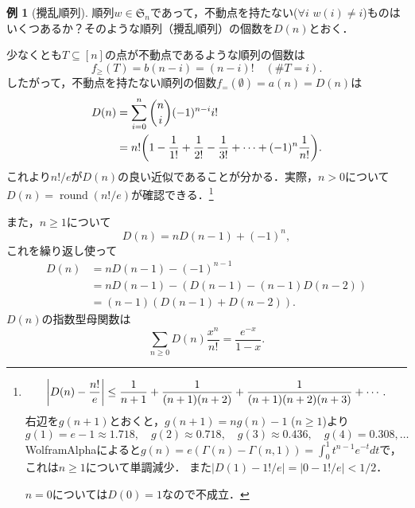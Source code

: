\documentclass[xelatex,ja=standard,a4paper,14pt,everyparhook=compat]{bxjsarticle}
\newcommand{\fS}{\mathfrak{S}}
\newcommand{\paren}[1]{\mleft(#1\mright)}
\newcommand{\norm}[1]{\mleft|#1\mright|}
\theoremstyle{definition}
\newtheorem{example}[theorem]{例}
\begin{document}
\begin{example}[攪乱順列]

    順列$w \in \fS_n$であって，不動点を持たない($\forall i$ $w(i) \neq i$)ものはいくつあるか？そのような順列（攪乱順列）の個数を$D(n)$とおく．

    少なくとも$T \subseteq [n]$の点が不動点であるような順列の個数は \begin{equation*}
        f_\geq(T) = b(n-i) = (n-i)! \quad (\#T = i).
    \end{equation*}
    したがって，不動点を持たない順列の個数$f_=(\emptyset) = a(n) = D(n)$は \begin{align*}
        D(n) & = \sum_{i=0}^n \binom{n}{i} (-1)^{n-i} i!                                                   \\
             & = n! \paren{1 - \frac{1}{1!} + \frac{1}{2!} - \frac{1}{3!} + \cdots + (-1)^n \frac{1}{n!}}.
    \end{align*}
    これより$n!/e$が$D(n)$の良い近似であることが分かる．実際，$n > 0$について$D(n) = \operatorname{round}(n!/e)$が確認できる．\footnote{
        \begin{equation*}
            \norm{D(n) - \frac{n!}{e}} \leq \frac{1}{n+1} + \frac{1}{(n+1)(n+2)} + \frac{1}{(n+1)(n+2)(n+3)} + \cdots.
        \end{equation*}
        右辺を$g(n+1)$とおくと，$g(n+1) = n g(n) - 1$ ($n \geq 1$)より \begin{equation*}
            g(1) = e-1 \approx 1.718, \quad g(2) \approx 0.718, \quad g(3) \approx 0.436, \quad g(4) = 0.308, \ldots
        \end{equation*}
        WolframAlphaによると$g(n) = e(\Gamma(n) - \Gamma(n,1)) = \int_0^1 t^{n-1} e^{-t} dt$で，これは$n \geq 1$について単調減少．
        また$|D(1) - 1!/e| = |0 - 1!/e| < 1/2$．

        $n=0$については$D(0)=1$なので不成立．}

    また，$n \geq 1$について \begin{equation*}
        D(n) = n D(n-1) + (-1)^n,
    \end{equation*}
    これを繰り返し使って \begin{align*}
        D(n) & = n D(n-1) - (-1)^{n-1}             \\
             & = n D(n-1) - (D(n-1) - (n-1)D(n-2)) \\
             & = (n-1)(D(n-1)+D(n-2)).
    \end{align*}
    $D(n)$の指数型母関数は \begin{equation*}
        \sum_{n \geq 0} D(n) \frac{x^n}{n!} = \frac{e^{-x}}{1-x}.
    \end{equation*}
\end{example}
\end{document}
